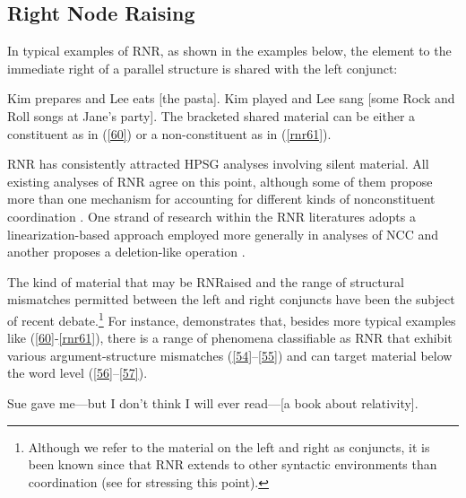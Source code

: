 \documentclass[output=paper
	        ,collection
	        ,collectionchapter
 	        ,biblatex
                ,babelshorthands
                ,newtxmath
                ,draftmode
                ,colorlinks, citecolor=brown
]{langscibook}
\begin{document}
{\subsection{Right Node Raising}

In typical examples of RNR, as shown in the examples below, the element to the immediate right of a parallel structure is shared with the left conjunct:

\ea \relax Kim prepares and Lee eats [the pasta].  \label{60} \z
\ea \relax Kim played and Lee sang [some Rock and Roll songs at Jane's party]. \label{rnr61}\z
%
The bracketed shared material can be either a constituent as in (\ref{60}) or a non-constituent as in (\ref{rnr61}).

RNR has consistently attracted HPSG analyses involving silent material.
All existing analyses of RNR \citep{Abeille2016, Beavers2004, Chaves2008-in-lexicon, Chaves2014, Crysmann2003, Shiraishi2019, Yatabe2001, Yatabe2012} agree on this point,
although some of them propose more than one mechanism for accounting for different kinds of nonconstituent coordination \citep{Chaves2014, Yatabe2001, Yatabe2012, Yatabe2019}. One strand of research within the RNR literatures adopts a linearization-based approach employed more generally in analyses of NCC \citep{Yatabe2001, Yatabe2012} and another proposes a deletion-like operation \citep{Abeille2016, Chaves2014, Shiraishi2019}.

%

The kind of material that may be RNRaised and the range of structural mismatches permitted between the left and right conjuncts have been the subject of recent debate.\footnote{Although we refer to the material on the left and right as conjuncts, it is been known since \citet{Hudson1976, Hudson1989} that RNR extends to other syntactic environments than coordination (see \citealt{Chaves2014} for stressing this point).} For instance, \citet[839--840]{Chaves2014} demonstrates that, besides more typical examples like (\ref{60}-\ref{rnr61}),
 there is a range of phenomena classifiable as RNR that exhibit various argument-structure mismatches (\ref{54}--\ref{55}) and can target material below the word level (\ref{56}--\ref{57}).
%

\ea Sue gave me---but I don't think I will ever read---[a book about relativity]. \label{54}\z

}
\end{document}
